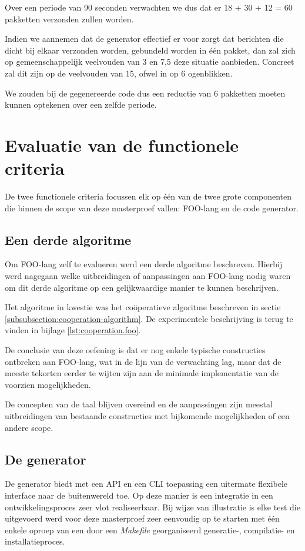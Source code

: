 Over een periode van 90 seconden verwachten we dus dat er 18 + 30 + 12 = 60
pakketten verzonden zullen worden.

Indien we aannemen dat de generator effectief er voor zorgt dat berichten die
dicht bij elkaar verzonden worden, gebundeld worden in \'e\'en pakket, dan zal
zich op gemeenschappelijk veelvouden van 3 en 7,5 deze situatie aanbieden.
Concreet zal dit zijn op de veelvouden van 15, ofwel in op 6 ogenblikken.

We zouden bij de gegenereerde code dus een reductie van 6 pakketten moeten
kunnen optekenen over een zelfde periode.

\section{Evaluatie van de functionele criteria}

De twee functionele criteria focussen elk op \'e\'en van de twee grote
componenten die binnen de scope van deze masterproef vallen: FOO-lang en de
code generator.

\subsection{Een derde algoritme}

Om FOO-lang zelf te evalueren werd een derde algoritme beschreven. Hierbij werd
nagegaan welke uitbreidingen of aanpassingen aan FOO-lang nodig waren om dit
derde algoritme op een gelijkwaardige manier te kunnen beschrijven.

Het algoritme in kwestie was het co\"operatieve algoritme beschreven in sectie
\ref{subsubsection:cooperation-algorithm}. De experimentele beschrijving is
terug te vinden in bijlage \ref{lst:cooperation.foo}.

De conclusie van deze oefening is dat er nog enkele typische constructies
ontbreken aan FOO-lang, wat in de lijn van de verwachting lag, maar dat de
meeste tekorten eerder te wijten zijn aan de minimale implementatie van de
voorzien mogelijkheden.

De concepten van de taal blijven overeind en de aanpassingen zijn meestal
uitbreidingen van bestaande constructies met bijkomende mogelijkheden of een
andere scope.

\subsection{De generator}

De generator biedt met een API en een CLI toepassing een uitermate flexibele
interface naar de buitenwereld toe. Op deze manier is een integratie in een
ontwikkelingsproces zeer vlot realiseerbaar. Bij wijze van illustratie is elke
test die uitgevoerd werd voor deze masterproef zeer eenvoudig op te starten met
\'e\'en enkele oproep van een door een \emph{Makefile} georganiseerd
generatie-, compilatie- en installatieproces.

